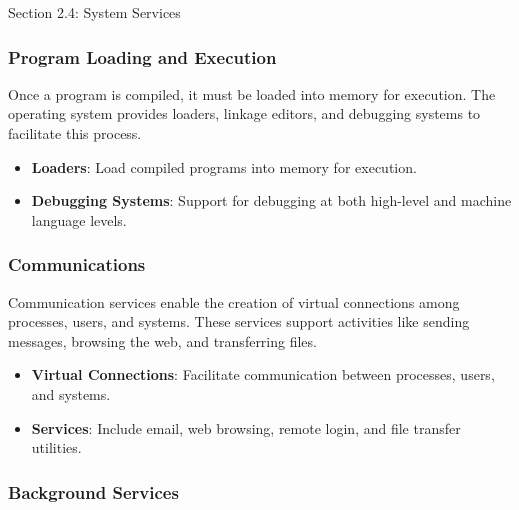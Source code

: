 \begin{notes}{Section 2.4: System Services}
\begin{highlight}
    \end{highlight}
    
    \subsubsection*{Program Loading and Execution}
    
    Once a program is compiled, it must be loaded into memory for execution. The operating system provides loaders, linkage editors, and debugging systems to facilitate this process.
    
    \begin{highlight}
    
    \begin{itemize}
        \item \textbf{Loaders}: Load compiled programs into memory for execution.
        \item \textbf{Debugging Systems}: Support for debugging at both high-level and machine language levels.
    \end{itemize}
    
    \end{highlight}
    
    \subsubsection*{Communications}
    
    Communication services enable the creation of virtual connections among processes, users, and systems. These services support activities like sending messages, browsing the web, and transferring files.
    
    \begin{highlight}[Communications]
    
    \begin{itemize}
        \item \textbf{Virtual Connections}: Facilitate communication between processes, users, and systems.
        \item \textbf{Services}: Include email, web browsing, remote login, and file transfer utilities.
    \end{itemize}
    
    \end{highlight}
    
    \subsubsection*{Background Services}
    

\end{notes}
